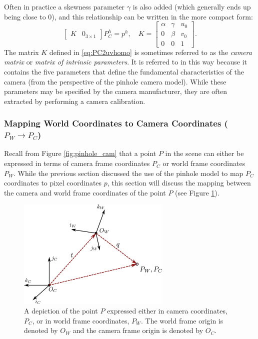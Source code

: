 Often in practice a skewness parameter $\gamma$ is also added (which generally ends up being close to 0), and this relationship can be written in the more compact form:
\begin{equation} \label{eq:PC2uvhomo}
    \begin{bmatrix}
        K & 0_{3 \times 1}
    \end{bmatrix} P_C^h = p^h, \quad K = \begin{bmatrix}
\alpha & \gamma & u_{0} \\
0 & \beta & v_{0}  \\
0 & 0 & 1
\end{bmatrix}.
\end{equation}
The matrix $K$ defined in \eqref{eq:PC2uvhomo} is sometimes referred to as the \textit{camera matrix} or \textit{matrix of intrinsic parameters}. It is referred to in this way because it contains the five parameters that define the fundamental characteristics of the camera (from the perspective of the pinhole camera model). While these parameters may be specified by the camera manufacturer, they are often extracted by performing a camera calibration.


\subsubsection{Mapping World Coordinates to Camera Coordinates ($P_W \xrightarrow{} P_C$)}
Recall from Figure \ref{fig:pinhole_cam} that a point $P$ in the scene can either be expressed in terms of camera frame coordinates $P_C$ or world frame coordinates $P_W$. While the previous section discussed the use of the pinhole model to map $P_C$ coordinates to pixel coordinates $p$, this section will discuss the mapping between the camera and world frame coordinates of the point $P$ (see Figure \ref{fig:Pc2Pw}).
\begin{figure}[ht]
\centering
\includegraphics[width=0.65\textwidth]{tex/figs/ch09_figs/world2camera.png}
\caption{A depiction of the point $P$ expressed either in camera coordinates, $P_C$, or in world frame coordinates, $P_W$. The world frame origin is denoted by $O_W$ and the camera frame origin is denoted by $O_C$.}
\label{fig:Pc2Pw}
\end{figure}

